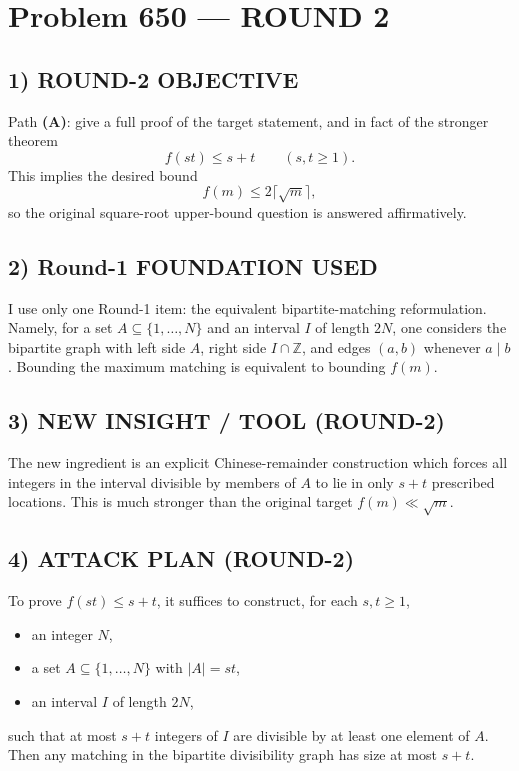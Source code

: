 \section{Problem 650 --- ROUND 2}

\subsection*{1) ROUND-2 OBJECTIVE}
Path \textbf{(A)}: give a full proof of the target statement, and in fact of the stronger theorem
\[
 f(st)\le s+t
\qquad (s,t\ge 1).
\]
This implies the desired bound
\[
 f(m)\le 2\lceil \sqrt m\rceil,
\]
so the original square-root upper-bound question is answered affirmatively.

\subsection*{2) Round-1 FOUNDATION USED}
I use only one Round-1 item: the equivalent bipartite-matching reformulation.  Namely, for a set $A\subseteq \{1,\dots,N\}$ and an interval $I$ of length $2N$, one considers the bipartite graph with left side $A$, right side $I\cap\mathbb Z$, and edges $(a,b)$ whenever $a\mid b$.  Bounding the maximum matching is equivalent to bounding $f(m)$.

\subsection*{3) NEW INSIGHT / TOOL (ROUND-2)}
The new ingredient is an explicit Chinese-remainder construction which forces all integers in the interval divisible by members of $A$ to lie in only $s+t$ prescribed locations.  This is much stronger than the original target $f(m)\ll \sqrt m$.

\subsection*{4) ATTACK PLAN (ROUND-2)}
To prove $f(st)\le s+t$, it suffices to construct, for each $s,t\ge 1$,

\begin{itemize}
\item an integer $N$,
\item a set $A\subseteq \{1,\dots,N\}$ with $|A|=st$,
\item an interval $I$ of length $2N$,
\end{itemize}

such that at most $s+t$ integers of $I$ are divisible by at least one element of $A$.
Then any matching in the bipartite divisibility graph has size at most $s+t$.

